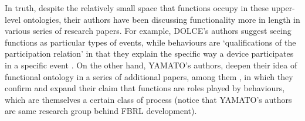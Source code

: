\documentclass[sw]{iosart2x}
\newcommand{\DOLCE}{\textsc{DOLCE}\xspace} %
\newcommand{\YAMATO}{\textsc{YAMATO}\xspace}
\begin{document}
In truth, despite the relatively small space that functions occupy in these upper-level ontologies, their authors have been discussing functionality more in length in various series of research papers. 
For example, \DOLCE's authors suggest seeing functions as particular types of events, while behaviours are `qualifications of the participation relation' in that they explain the specific way a device participates in a specific event \cite{borgoCapabilitiesCapacitiesFunctionalities2021,borgoFormalizationFunctionsOperations2011, garbaczTwoOntologydrivenFormalisations2011}. %
On the other hand, \YAMATO's authors, deepen their idea of functional ontology in a series of additional papers, among them \cite{kitamuraOntologicalModelDevice2006, kitamuraCharacterizingFunctionsBased2013, mizoguchiFunctionalOntologyArtifacts2009}, in which they confirm and expand their claim that functions are roles played by behaviours, which are themselves a certain class of process (notice that \YAMATO's authors are same research group behind FBRL development).
\end{document}
